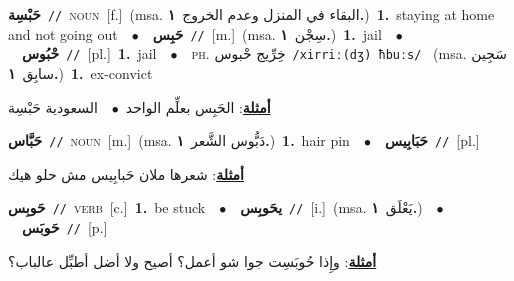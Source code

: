 \documentclass[10pt,a4paper,twoside]{article} %
\begin{document}
\begin{multicols}{2}
{{{{\setlength\topsep{0pt}\textbf{\foreignlanguage{arabic}{حَبْسِة}}\ {\color{gray}\texttt{//}\color{black}}\ \textsc{noun}\ [f.]\ \color{gray}(msa. \foreignlanguage{arabic}{البقاء في المنزل وعدم الخروج}~\foreignlanguage{arabic}{\textbf{١.}})\color{black}\ \textbf{1.}~staying at home and not going out\ \ $\bullet$\ \ \setlength\topsep{0pt}\textbf{\foreignlanguage{arabic}{حَبِس}}\ {\color{gray}\texttt{//}\color{black}}\ [m.]\ \color{gray}(msa. \foreignlanguage{arabic}{سِجْن}~\foreignlanguage{arabic}{\textbf{١.}})\color{black}\ \textbf{1.}~jail\ \ $\bullet$\ \ \setlength\topsep{0pt}\textbf{\foreignlanguage{arabic}{حْبُوس}}\ {\color{gray}\texttt{//}\color{black}}\ [pl.]\ \textbf{1.}~jail\ \ $\bullet$\ \ \textsc{ph.} \color{gray} \foreignlanguage{arabic}{خِرِّيج حْبوس}\color{black}\ {\color{gray}\texttt{/{\sffamily xirriː(dʒ) ħbuːs}/}\color{black}}\ \color{gray} (msa. \foreignlanguage{arabic}{سَجِين سابِق}~\foreignlanguage{arabic}{\textbf{١.}})\color{black}\ \textbf{1.}~ex-convict\  \begin{flushright}\color{gray}\foreignlanguage{arabic}{\textbf{\underline{\foreignlanguage{arabic}{أمثلة}}}: الحَبِس بعلِّم الواحد\ $\bullet$\ \  السعودية حَبْسِة}\end{flushright}\color{black}} \vspace{2mm}

{\setlength\topsep{0pt}\textbf{\foreignlanguage{arabic}{حَبَّاس}}\ {\color{gray}\texttt{//}\color{black}}\ \textsc{noun}\ [m.]\ \color{gray}(msa. \foreignlanguage{arabic}{دَبُّوس الشَّعر}~\foreignlanguage{arabic}{\textbf{١.}})\color{black}\ \textbf{1.}~hair pin\ \ $\bullet$\ \ \setlength\topsep{0pt}\textbf{\foreignlanguage{arabic}{حَبَابِيس}}\ {\color{gray}\texttt{//}\color{black}}\ [pl.]\  \begin{flushright}\color{gray}\foreignlanguage{arabic}{\textbf{\underline{\foreignlanguage{arabic}{أمثلة}}}: شعرها ملان حَبابِيس مش حلو هيك}\end{flushright}\color{black}} \vspace{2mm}

{\setlength\topsep{0pt}\textbf{\foreignlanguage{arabic}{حَوبِس}}\ {\color{gray}\texttt{//}\color{black}}\ \textsc{verb}\ [c.]\ \textbf{1.}~be stuck\ \ $\bullet$\ \ \setlength\topsep{0pt}\textbf{\foreignlanguage{arabic}{يحَوبِس}}\ {\color{gray}\texttt{//}\color{black}}\ [i.]\ \color{gray}(msa. \foreignlanguage{arabic}{يَعْلَق}~\foreignlanguage{arabic}{\textbf{١.}})\color{black}\ \ $\bullet$\ \ \setlength\topsep{0pt}\textbf{\foreignlanguage{arabic}{حَوبَس}}\ {\color{gray}\texttt{//}\color{black}}\ [p.]\  \begin{flushright}\color{gray}\foreignlanguage{arabic}{\textbf{\underline{\foreignlanguage{arabic}{أمثلة}}}: وإِذا حُوبَسِت جوا شو أعمل؟ أصيح ولا أضل أطبِّل عالباب؟}\end{flushright}\color{black}} \vspace{2mm}

}}}
\end{multicols}
\end{document}
